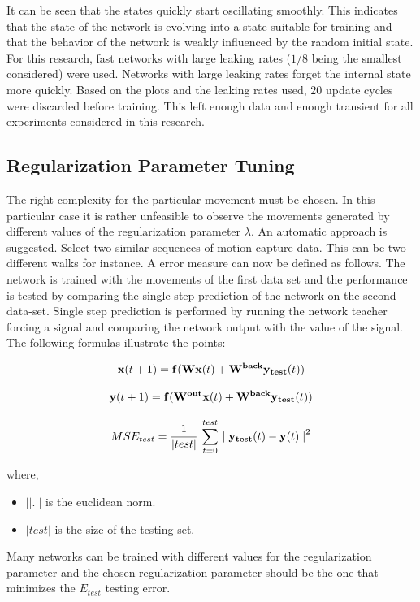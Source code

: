 \documentclass[letterpaper,9pt]{article}
\newcommand{\vectornorm}[1]{\left|\left|#1\right|\right|}
\begin{document}
It can be seen that the states quickly start oscillating smoothly. This indicates that the state of the network is evolving into a state suitable for training and that the behavior of the network is weakly influenced by the random initial state. For this research, fast networks with large leaking rates ($1/8$ being the smallest considered) were used. Networks with large leaking rates forget the internal state more quickly. Based on the plots and the leaking rates used, $20$ update cycles were discarded before training. This left enough data and enough transient for all experiments considered in this research. 

\subsection{Regularization Parameter Tuning}

The right complexity for the particular movement must be chosen. In this particular case it is rather unfeasible to observe the movements generated by different values of the regularization parameter $\lambda$. An automatic approach is suggested. Select two similar sequences of motion capture data. This can be two different walks for instance. A error measure can now be defined as follows. The network is trained with the movements of the first data set and the performance is tested by comparing the single step prediction of the network on the second data-set. Single step prediction is performed by running the network teacher forcing a signal and comparing the network output with the value of the signal. The following formulas illustrate the points:

\[
{\bf x}(t+1)={\bf f}({\bf Wx}(t)+{\bf W^{back}y_{test}}(t))
\]

\[
{\bf y}(t+1)={\bf f}({\bf W^{out}x}(t)+{\bf W^{back}y_{test}}(t))
\]

\[
MSE_{test} = \frac{1}{|test|}\sum_{t=0}^{|test|}\vectornorm{{\bf y_{test}}(t) - {\bf y} (t)}^2
\]

where,
\begin{itemize}
\item $\vectornorm{.}$ is the euclidean norm.
\item $|test|$ is the size of the testing set.
\end{itemize}

Many networks can be trained with different values for the regularization parameter and the chosen regularization parameter should be the one that minimizes the $E_{test}$ testing error.
\end{document}
